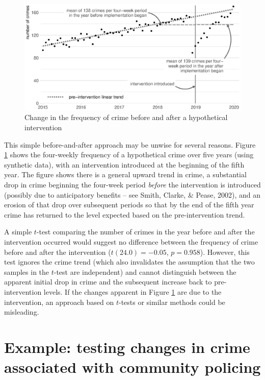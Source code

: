 \documentclass[
  english,
  man,a4paper,mask,floatsintext]{apa6}
\begin{document}
\begin{figure}
\centering
\includegraphics{figure_14-7.eps}
\caption{\label{fig:beforeafter}Change in the frequency of crime before and after a hypothetical intervention}
\end{figure}

This simple before-and-after approach may be unwise for several reasons. Figure \ref{fig:beforeafter} shows the four-weekly frequency of a hypothetical crime over five years (using synthetic data), with an intervention introduced at the beginning of the fifth year. The figure shows there is a general upward trend in crime, a substantial drop in crime beginning the four-week period \emph{before} the intervention is introduced (possibly due to anticipatory benefits -- see Smith, Clarke, \& Pease, 2002), and an erosion of that drop over subsequent periods so that by the end of the fifth year crime has returned to the level expected based on the pre-intervention trend.

A simple \(t\)-test comparing the number of crimes in the year before and after the intervention occurred would suggest no difference between the frequency of crime before and after the intervention (\(t(24.0) = -0.05\), \(p=0.958\)). However, this test ignores the crime trend (which also invalidates the assumption that the two samples in the \(t\)-test are independent) and cannot distinguish between the apparent initial drop in crime and the subsequent increase back to pre-intervention levels. If the changes apparent in Figure \ref{fig:beforeafter} are due to the intervention, an approach based on \(t\)-tests or similar methods could be misleading.

\hypertarget{example-testing-changes-in-crime-associated-with-community-policing}{%
\section{Example: testing changes in crime associated with community policing}\label{example-testing-changes-in-crime-associated-with-community-policing}}
\end{document}
